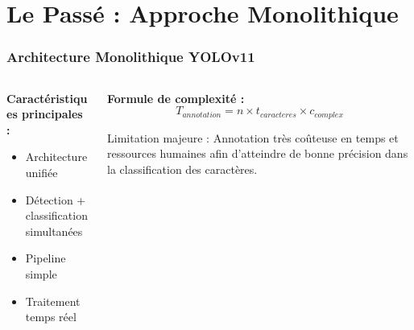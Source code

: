 \documentclass[
	11pt,
	aspectratio=169,
]{beamer}
\begin{document}
\section{Le Passé : Approche Monolithique}

\begin{frame}
	\frametitle{Architecture Monolithique YOLOv11}

	\begin{columns}[c]
		\begin{column}{0.5\textwidth}
			\textbf{Caractéristiques principales :}
			\begin{itemize}
				\item Architecture unifiée
				\item Détection + classification simultanées
				\item Pipeline simple
				\item Traitement temps réel
			\end{itemize}
		\end{column}
		
		\begin{column}{0.5\textwidth}
			\textbf{Formule de complexité :}
			\begin{equation*}
				T_{annotation} = n \times t_{caracteres} \times c_{complex}
			\end{equation*}
			
			\bigskip
			
			\alert{Limitation majeure :} Annotation très coûteuse en temps et ressources humaines
			afin d'atteindre de bonne précision dans la classification des caractères.
		\end{column}
	\end{columns}
\end{frame}

\end{document}
